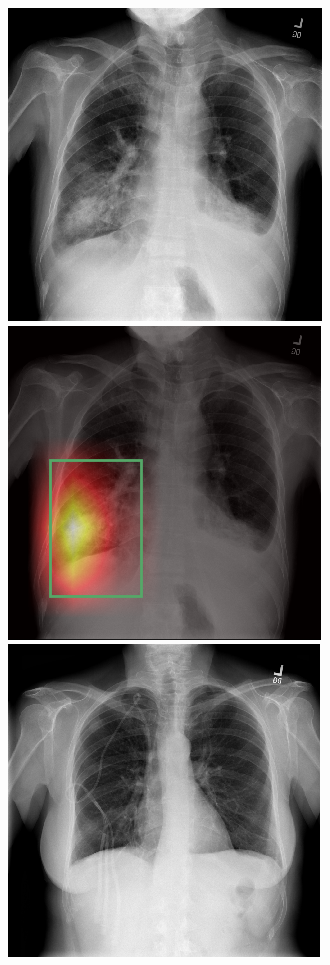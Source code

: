 \documentclass[8pt]{beamer}
\begin{document}
      \begin{frame}
        \begin{figure}
          \centering
          \includegraphics[height=0.4\textheight]{images/pneumonia_orig}\hspace{0.01\textwidth}%
          \includegraphics[height=0.4\textheight]{images/pneumonia_hm_bbox}\\[0.01\textwidth]
          \includegraphics[height=0.4\textheight]{images/atelectasis_orig}\hspace{0.01\textwidth}%

\end{figure}
\end{frame}
\end{document}
